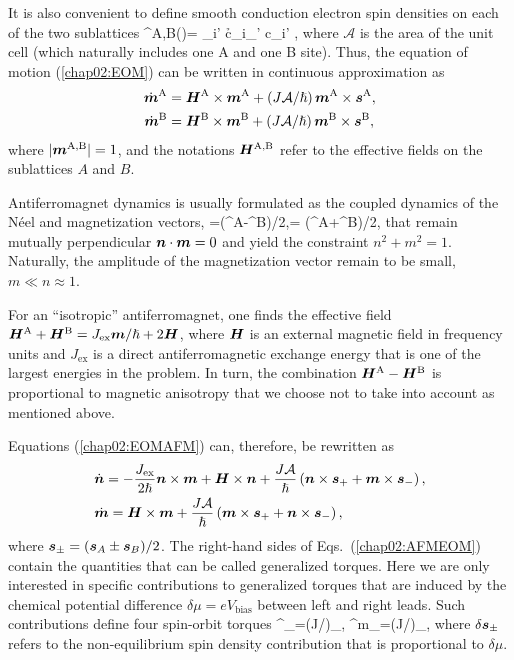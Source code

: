 It is also convenient to define smooth conduction electron spin densities on each of the two sublattices
\be
{}^\textrm{A,B}()=  \s_{i\sigma\sigma'} \lt\la c\h_{i\sigma}\bb{\sigma}_{\sigma\sigma'} c\0_{i\sigma'} \rt\ra\;,
\e
where $\mathcal{A}$ is the area of the unit cell (which naturally includes one A and one B site). Thus, the equation of motion (\ref{chap02:EOM}) can be written in  continuous approximation as
\beml
\label{chap02:EOMAFM}
\begin{align}
\dot{\boldsymbol{m}}^\textrm{A} &= \boldsymbol{H}^\textrm{A}\times \boldsymbol{m}^\textrm{A}+ (J\mathcal{A}/\hslash)\, \boldsymbol{m}^\textrm{A}\times \boldsymbol{s}^\textrm{A},\\
\dot{\boldsymbol{m}}^\textrm{B}&= \boldsymbol{H}^\textrm{B}\times \boldsymbol{m}^\textrm{B}+ (J\mathcal{A}/\hslash)\, \boldsymbol{m}^\textrm{B}\times \boldsymbol{s}^\textrm{B},
\end{align}
\eml
where $|\boldsymbol{m}^\textrm{A,B}|=1$, and the notations $\boldsymbol{H}^\textrm{A,B}$ refer to the effective fields on the sublattices $A$ and $B$. 

Antiferromagnet dynamics is usually formulated as the coupled dynamics of the N\'eel and magnetization vectors,
\be
{}=\lt(^\textrm{A}-^\textrm{B}\rt)/2,\qquad {}= \lt(^\textrm{A}+^\textrm{B}\rt)/2,
\e
that remain mutually perpendicular $\boldsymbol{n}\cdot \boldsymbol{m}=0$ and yield the constraint $n^2+m^2=1$. Naturally, the amplitude of the magnetization vector remain to be small, $m\ll n \approx 1$.

For an ``isotropic'' antiferromagnet, one finds the effective field \cite{gomonay_spintronics_2014} $\boldsymbol{H}^\textrm{A}+\boldsymbol{H}^\textrm{B}= J_\textrm{ex}\boldsymbol{m}/\hslash+2\boldsymbol{H}$, where $\boldsymbol{H}$ is an external magnetic field in frequency units and $J_\textrm{ex}$ is a direct antiferromagnetic exchange energy that is one of the largest energies in the problem. In turn, the combination $\boldsymbol{H}^\textrm{A}-\boldsymbol{H}^\textrm{B}$ is proportional to magnetic anisotropy that we choose not to take into account as mentioned above.  

Equations (\ref{chap02:EOMAFM}) can, therefore, be rewritten as
\begin{align}
&\dot{\boldsymbol{n}} = -\frac{J_\textrm{ex}}{2\hslash} \boldsymbol{n}\times\boldsymbol{m} +\boldsymbol{H}\times\boldsymbol{n}+\frac{J\mathcal{A}}{\hslash}\left(\boldsymbol{n}\times\boldsymbol{s}_++\boldsymbol{m}\times\boldsymbol{s}_-\right),\nonumber\\
&\dot{\boldsymbol{m}} = \boldsymbol{H}\times\boldsymbol{m}+\frac{J\mathcal{A}}{\hslash}\left(\boldsymbol{m}\times\boldsymbol{s}_++\boldsymbol{n}\times\boldsymbol{s}_-\right),
\label{chap02:AFMEOM}
\end{align}
where $\boldsymbol{s}_\pm=(\boldsymbol{s}_A\pm\boldsymbol{s}_B)/2$. The right-hand sides of Eqs.~(\ref{chap02:AFMEOM}) contain the quantities that can be called generalized torques. Here we are only interested in specific contributions to generalized torques that are induced by the chemical potential difference $\delta\mu=eV_\textrm{bias}$ between left and right leads. Such contributions define four spin-orbit torques  
\be
\label{chap02:SOT_def}
^\ell_\pm=(J/\hslash)\times\delta{}_\pm, \quad 
{}^m_\pm=(J/\hslash)\times\delta{}_\pm,
\e
where $\delta \boldsymbol{s}_\pm$ refers to the non-equilibrium spin density contribution that is proportional to $\delta\mu$. 

